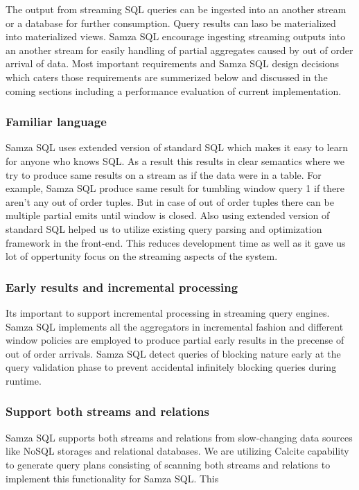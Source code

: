 \documentclass[10pt, conference, compsocconf]{IEEEtran}
\begin{document}
The output from streaming SQL queries can be ingested into an another stream or a database for further consumption. Query results can laso be materialized into materialized views. Samza SQL encourage ingesting streaming outputs into an another stream for easily handling of partial aggregates caused by out of order arrival of data. Most important requirements and Samza SQL design decisions which caters those requirements are summerized below and discussed in the coming sections including a performance evaluation of current implementation.

\subsubsection{Familiar language}

Samza SQL uses extended version of standard SQL which makes it easy to learn for anyone who knows SQL. As a result this results in clear semantics where we try to produce same results on a stream as if the data were in a table. For example, Samza SQL produce same result for tumbling window query 1 if there aren't any out of order tuples. But in case of out of order tuples there can be multiple partial emits until window is closed. Also using extended version of standard SQL helped us to utilize existing query parsing and optimization framework in the front-end. This reduces development time as well as it gave us lot of oppertunity focus on the streaming aspects of the system.

\subsubsection{Early results and incremental processing}

Its important to support incremental processing in streaming query engines. Samza SQL implements all the aggregators in incremental fashion and different window policies are employed to produce partial early results in the precense of out of order arrivals. Samza SQL detect queries of blocking nature early at the query validation phase to prevent accidental infinitely blocking queries during runtime.

\subsubsection{Support both streams and relations}

Samza SQL supports both streams and relations from slow-changing data sources like NoSQL storages and relational databases. We are utilizing Calcite capability to generate query plans consisting of scanning both streams and relations to implement this functionality for Samza SQL. This 
\end{document}
